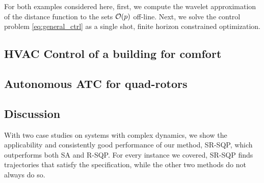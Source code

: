 For both examples considered here, first, we compute the wavelet approximation of the distance function to the sets $\mathcal{O}(p)$ off-line. Next, we solve the control problem \eqref{eq:general_ctrl} as a single shot, finite horizon constrained optimization. 


\subsection{HVAC Control of a building for comfort}


\subsection{Autonomous ATC for quad-rotors}
\label{sec:ATCquad}


\subsection{Discussion}
With two case studies on systems with complex dynamics, we show the applicability and consistently good performance of our method, SR-SQP, which outperforms both SA and R-SQP. For every instance we covered, SR-SQP finds trajectories that satisfy the specification, while the other two methods do not always do so.


